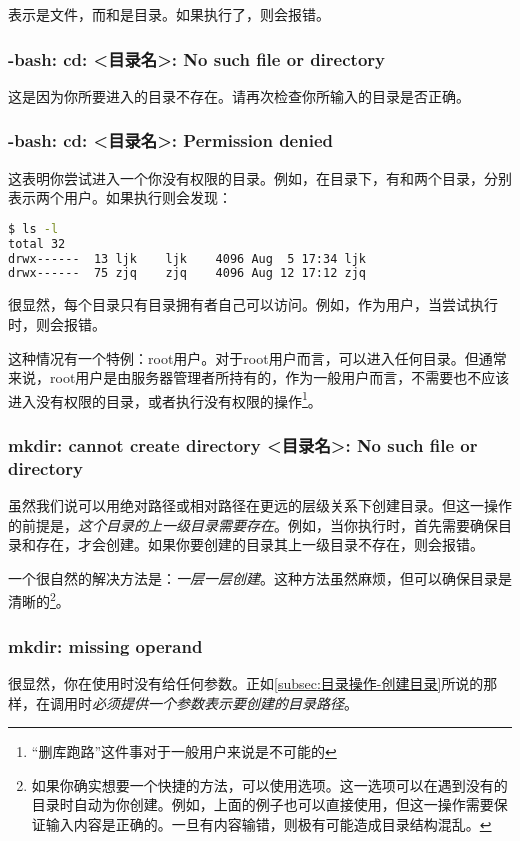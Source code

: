 表示是文件，而和是目录。如果执行了，则会报错。

\subsubsection{-bash: cd: <目录名>: No such file or directory}

这是因为你所要进入的目录不存在。请再次检查你所输入的目录是否正确。

\subsubsection{-bash: cd: <目录名>: Permission denied}

这表明你尝试进入一个你没有权限的目录。例如，在目录下，有和两个目录，分别表示两个用户。如果执行则会发现：

\begin{lstlisting}[language=bash]
$ ls -l
total 32
drwx------  13 ljk    ljk    4096 Aug  5 17:34 ljk
drwx------  75 zjq    zjq    4096 Aug 12 17:12 zjq
\end{lstlisting}

很显然，每个目录只有目录拥有者自己可以访问。例如，作为用户，当尝试执行时，则会报错。

\begin{extend}
    这种情况有一个特例：root用户。对于root用户而言，可以进入任何目录。但通常来说，root用户是由服务器管理者所持有的，作为一般用户而言，不需要也不应该进入没有权限的目录，或者执行没有权限的操作\footnote{“删库跑路”这件事对于一般用户来说是不可能的}。
\end{extend}

\subsubsection{mkdir: cannot create directory <目录名>: No such file or directory}

虽然我们说可以用绝对路径或相对路径在更远的层级关系下创建目录。但这一操作的前提是，\emph{这个目录的上一级目录需要存在}。例如，当你执行时，首先需要确保目录和存在，才会创建。如果你要创建的目录其上一级目录不存在，则会报错。

一个很自然的解决方法是：\emph{一层一层创建}。这种方法虽然麻烦，但可以确保目录是清晰的\footnote{如果你确实想要一个快捷的方法，可以使用选项。这一选项可以在遇到没有的目录时自动为你创建。例如，上面的例子也可以直接使用，但这一操作需要保证输入内容是正确的。一旦有内容输错，则极有可能造成目录结构混乱。}。

\subsubsection{mkdir: missing operand}

很显然，你在使用时没有给任何参数。正如\ref{subsec:目录操作-创建目录}所说的那样，在调用时\emph{必须提供一个参数表示要创建的目录路径}。